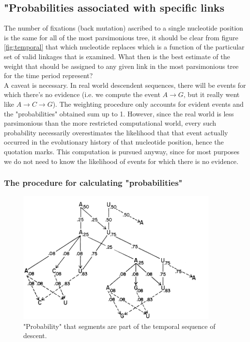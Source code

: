 \subsection{"Probabilities associated with specific links}
The number of fixations (back mutation) ascribed to a single nucleotide position is the same for all of the most parsimonious tree, it should be clear from figure \ref{fig:temporal} that which nucleotide replaces which is a function of the particular set of valid linkages that is examined. What then is the best estimate of the weight that should be assigned to any given link in the most parsimonious tree for the time period represent?
\\
A caveat is necessary. In real world descendent sequences, there will be events for which there's no evidence (i.e. we compute the event $A \rightarrow G$, but it really went like $A \rightarrow C \rightarrow G$). The weighting procedure only accounts for evident events and the "probabilities" obtained sum up to 1. However, since the real world is less parsimonious than the more restricted computational world, every such probability necessarily overestimates the likelihood that that event actually occurred in the evolutionary history of that nucleotide position, hence the quotation marks. This  computation is pursued anyway, since for most purposes we do not need to know the likelihood of events for which there is no evidence.

\subsubsection{The procedure for calculating "probabilities"}

\begin{figure}[H]
		\centering
		\includegraphics[width=0.9\textwidth]{5.png}
		\caption{"Probability" that segments are part of the temporal sequence of descent.}
		\label{fig:prob}
	\end{figure}

